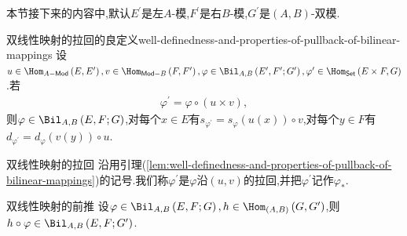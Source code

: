 本节接下来的内容中,默认$E^{\prime}$是左$A$-模,$F^{\prime}$是右$B$-模,$G^{\prime}$是$\left(A,B\right)$-双模.

\begin{lemma}{双线性映射的拉回的良定义}{well-definedness-and-properties-of-pullback-of-bilinear-mappings}
	设$u\in\Hom_{A-\mathsf{Mod}}\left(E,E^{\prime}\right),v\in\Hom_{\mathsf{Mod}-B}\left(F,F^{\prime}\right),\varphi\in\Bil_{A,B}\left(E^{\prime},F^{\prime};G^{\prime}\right),\varphi^{\prime}\in\Hom_{\mathsf{Set}}\left(E\times F,G\right)$.若
	\begin{align*}
		\varphi^{\prime}=\varphi\circ\left(u\times v\right),
	\end{align*}
	则$\varphi\in\Bil_{A,B}\left(E,F;G\right)$,对每个$x\in E$有$s_{\varphi^{\prime}}=s_{\varphi}\left(u\left(x\right)\right)\circ v$,对每个$y\in F$有$d_{\varphi^{\prime}}=d_{\varphi}\left(v\left(y\right)\right)\circ u$.
\end{lemma}

\begin{definition}{双线性映射的拉回}{}
	沿用引理(\cref{lem:well-definedness-and-properties-of-pullback-of-bilinear-mappings})的记号.我们称$\varphi^{\prime}$是$\varphi$沿$\left(u,v\right)$的拉回,并把$\varphi^{\prime}$记作$\varphi_{\ast}$.
\end{definition}

\begin{proposition}{双线性映射的前推}{}
	设$\varphi\in\Bil_{A,B}\left(E,F;G\right),h\in\Hom_{\left(A,B\right)}\left(G,G^{\prime}\right)$,则$h\circ\varphi\in\Bil_{A,B}\left(E,F;G^{\prime}\right)$.
\end{proposition}
















